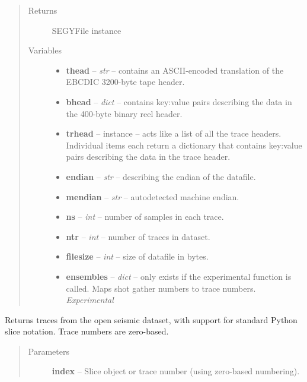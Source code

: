 \documentclass[letterpaper,10pt,english]{sphinxmanual}
\begin{document}
\begin{fulllineitems}
\begin{quote}
\begin{description}
\item[{Returns}] \leavevmode
SEGYFile instance

\item[{Variables}] \leavevmode\begin{itemize}
\item {} 
\textbf{thead} -- \emph{str} -- contains an ASCII-encoded translation of the EBCDIC 3200-byte tape header.

\item {} 
\textbf{bhead} -- \emph{dict} -- contains key:value pairs describing the data in the 400-byte binary reel header.

\item {} 
\textbf{trhead} -- {\hyperref[segyread:pygeo.segyread.SEGYTraceHeader]{}} instance -- acts like a list of all the trace headers.  Individual items each return a dictionary that contains key:value pairs describing the data in the trace header.

\item {} 
\textbf{endian} -- \emph{str} -- describing the endian of the datafile.

\item {} 
\textbf{mendian} -- \emph{str} -- autodetected machine endian.

\item {} 
\textbf{ns} -- \emph{int} -- number of samples in each trace.

\item {} 
\textbf{ntr} -- \emph{int} -- number of traces in dataset.

\item {} 
\textbf{filesize} -- \emph{int} -- size of datafile in bytes.

\item {} 
\textbf{ensembles} -- \emph{dict} -- only exists if the experimental function  is called.  Maps shot gather numbers to trace numbers.  \emph{Experimental}

\end{itemize}

\end{description}\end{quote}

\begin{fulllineitems}
\label{segyread:pygeo.segyread.SEGYFile.__getitem__}
Returns traces from the open seismic dataset, with support for standard
Python slice notation.  Trace numbers are zero-based.
\begin{quote}\begin{description}
\item[{Parameters}] \leavevmode
\textbf{index} -- Slice object or trace number (using zero-based numbering).


\end{description}
\end{quote}
\end{fulllineitems}
\end{fulllineitems}
\end{document}
